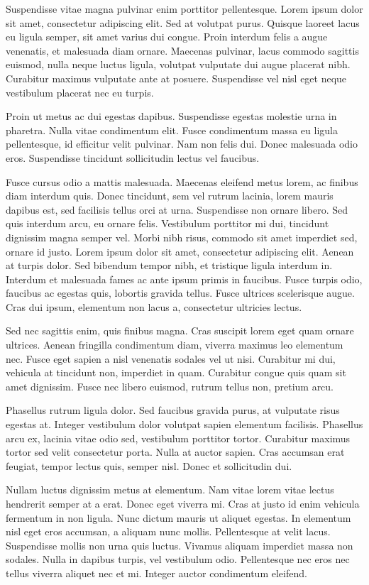 Suspendisse vitae magna pulvinar enim porttitor pellentesque. Lorem ipsum dolor sit amet, consectetur adipiscing elit. Sed at volutpat purus. Quisque laoreet lacus eu ligula semper, sit amet varius dui congue. Proin interdum felis a augue venenatis, et malesuada diam ornare. Maecenas pulvinar, lacus commodo sagittis euismod, nulla neque luctus ligula, volutpat vulputate dui augue placerat nibh. Curabitur maximus vulputate ante at posuere. Suspendisse vel nisl eget neque vestibulum placerat nec eu turpis.

Proin ut metus ac dui egestas dapibus. Suspendisse egestas molestie urna in pharetra. Nulla vitae condimentum elit. Fusce condimentum massa eu ligula pellentesque, id efficitur velit pulvinar. Nam non felis dui. Donec malesuada odio eros. Suspendisse tincidunt sollicitudin lectus vel faucibus.

Fusce cursus odio a mattis malesuada. Maecenas eleifend metus lorem, ac finibus diam interdum quis. Donec tincidunt, sem vel rutrum lacinia, lorem mauris dapibus est, sed facilisis tellus orci at urna. Suspendisse non ornare libero. Sed quis interdum arcu, eu ornare felis. Vestibulum porttitor mi dui, tincidunt dignissim magna semper vel. Morbi nibh risus, commodo sit amet imperdiet sed, ornare id justo. Lorem ipsum dolor sit amet, consectetur adipiscing elit. Aenean at turpis dolor. Sed bibendum tempor nibh, et tristique ligula interdum in. Interdum et malesuada fames ac ante ipsum primis in faucibus. Fusce turpis odio, faucibus ac egestas quis, lobortis gravida tellus. Fusce ultrices scelerisque augue. Cras dui ipsum, elementum non lacus a, consectetur ultricies lectus.

Sed nec sagittis enim, quis finibus magna. Cras suscipit lorem eget quam ornare ultrices. Aenean fringilla condimentum diam, viverra maximus leo elementum nec. Fusce eget sapien a nisl venenatis sodales vel ut nisi. Curabitur mi dui, vehicula at tincidunt non, imperdiet in quam. Curabitur congue quis quam sit amet dignissim. Fusce nec libero euismod, rutrum tellus non, pretium arcu.

Phasellus rutrum ligula dolor. Sed faucibus gravida purus, at vulputate risus egestas at. Integer vestibulum dolor volutpat sapien elementum facilisis. Phasellus arcu ex, lacinia vitae odio sed, vestibulum porttitor tortor. Curabitur maximus tortor sed velit consectetur porta. Nulla at auctor sapien. Cras accumsan erat feugiat, tempor lectus quis, semper nisl. Donec et sollicitudin dui.

Nullam luctus dignissim metus at elementum. Nam vitae lorem vitae lectus hendrerit semper at a erat. Donec eget viverra mi. Cras at justo id enim vehicula fermentum in non ligula. Nunc dictum mauris ut aliquet egestas. In elementum nisl eget eros accumsan, a aliquam nunc mollis. Pellentesque at velit lacus. Suspendisse mollis non urna quis luctus. Vivamus aliquam imperdiet massa non sodales. Nulla in dapibus turpis, vel vestibulum odio. Pellentesque nec eros nec tellus viverra aliquet nec et mi. Integer auctor condimentum eleifend.

